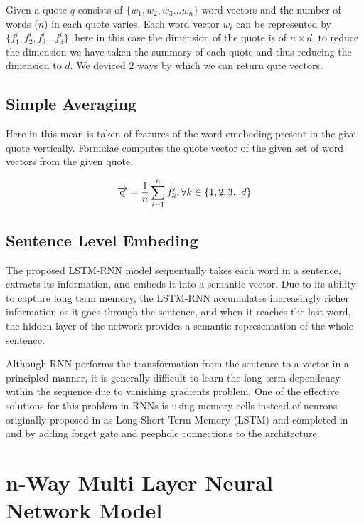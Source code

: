 \documentclass[BTech]{srmuthesis}
\begin{document}
Given a quote $q$ consists of $\{w_1, w_2, w_3 ... w_n\}$ word vectors and the number of words ($n$) in each quote varies. Each word vector $w_i$ can be represented by $\{f_1^i, f_2^i, f_3^i ... f_d^i\}$. here in this case the dimension of the quote is of $n \times d$, to reduce the dimension we have taken the summary of each quote and thus reducing the dimension to $d$. We deviced 2 ways by which we can return qute vectors.

\section{Simple Averaging}

Here in this mean is taken of features of the word emebeding present in the give quote vertically. Formulae computes the quote vector of the given set of word vectors from the given quote.

\begin{center}
	$$\overrightarrow{\rm q} = \frac{1}{n} \sum_{i=1}^{n} f_k^i , \forall k \in \{1,2,3 ... d\} $$
\end{center}

\section{Sentence Level Embeding}

The proposed LSTM-RNN model sequentially takes each word in a sentence, extracts its information, and embeds it into a semantic vector. Due to its ability to capture long term memory, the LSTM-RNN accumulates increasingly richer information as it goes through the sentence, and when it reaches the last word, the hidden layer of the network provides a semantic representation of the whole sentence.

Although RNN performs the transformation from the sentence to a vector in a principled manner, it is generally difficult to learn the long term dependency within the sequence due to vanishing gradients problem. One of the effective solutions for this problem in RNNs is using memory cells instead of neurons originally proposed in as Long Short-Term Memory (LSTM) and completed in and by adding forget gate and peephole connections to the architecture.



\chapter{n-Way Multi Layer Neural Network Model}
\end{document}

